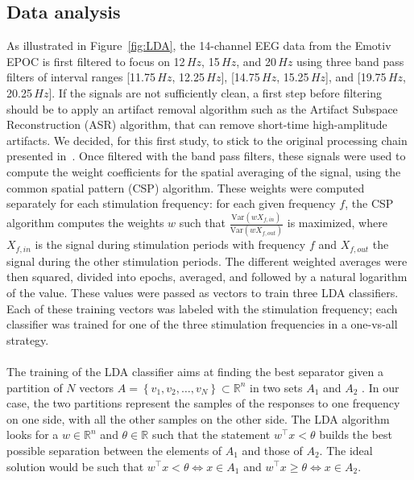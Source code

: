 \documentclass[smallextended]{svjour3}
\begin{document}
\subsection{Data analysis}
As illustrated in Figure~\ref{fig:LDA}, the 14-channel EEG data from the Emotiv EPOC is first filtered to focus on 12\,$Hz$, 15\,$Hz$, and 20\,$Hz$ using three band pass filters of interval ranges [11.75\,$Hz$, 12.25\,$Hz$], [14.75\,$Hz$, 15.25\,$Hz$], and [19.75\,$Hz$, 20.25\,$Hz$]. 
If the signals are not sufficiently clean, a first step before filtering should be to apply an artifact removal algorithm such as the Artifact Subspace Reconstruction (ASR) algorithm, that can remove short-time high-amplitude artifacts. 
We decided, for this first study, to stick to the original processing chain presented in~\cite{openvibeSSVEP}.
Once filtered with the band pass filters, these signals were used to compute the weight coefficients for the spatial averaging of the signal, using the common spatial pattern (CSP) algorithm. These weights were computed separately for each stimulation frequency: for each given frequency $f$, the CSP algorithm computes the weights $w$ such that $\frac{\textrm{Var}(w X_{f,in})}{\textrm{Var}(w X_{f,out})}$ is maximized, where $X_{f,in}$ is the signal during stimulation periods with frequency $f$ and $X_{f,out}$ the signal during the other stimulation periods. 
The different weighted averages were then squared, divided into epochs, averaged, and followed by a natural logarithm of the value. These values were passed as vectors to train three LDA classifiers. 
Each of these training vectors was labeled with the stimulation frequency; each classifier was trained for one of the three stimulation frequencies in a one-vs-all strategy. \\
\\
The training of the LDA classifier aims at finding the best separator given a partition of $N$ vectors $A = \left\{v_1, v_2, \hdots, v_N\right\} \subset \mathbb R^n$ in two sets $A_1$ and $A_2$ . In our case, the two partitions represent the samples of the responses to one frequency on one side, with all the other samples on the other side.
The LDA algorithm looks for a $w\in\mathbb R^n$ and $\theta\in\mathbb R$ such that the statement $w^\top x < \theta$ builds the best possible separation between the elements of $A_1$ and those of $A_2$. The ideal solution would be such that $w^\top x < \theta \Leftrightarrow x\in A_1$ and $w^\top x \geq \theta \Leftrightarrow x\in A_2$.
\end{document}
